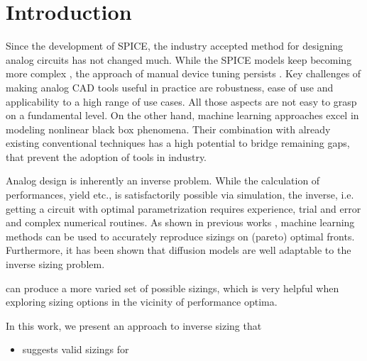 \documentclass[conference]{IEEEtran}
\begin{document}
\section{Introduction}
	Since the development of SPICE, the industry accepted method for designing analog circuits has not changed much. While the SPICE models keep becoming more complex \cite{gatermann22mosfet}, the approach of manual device tuning persists \cite{gielen23workshop}. Key challenges of making analog CAD tools useful in practice are robustness, ease of use and applicability to a high range of use cases. All those aspects are not easy to grasp on a fundamental level. On the other hand, machine learning approaches excel in modeling nonlinear black box phenomena. Their combination with already existing conventional techniques has a high potential to bridge remaining gaps, that prevent the adoption of tools in industry.
	
	Analog design is inherently an inverse problem. While the calculation of performances, yield etc., is satisfactorily possible via simulation, the inverse, i.e. getting a circuit with optimal parametrization requires experience, trial and error and complex numerical routines. As shown in previous works \cite{ leibl24inverse, lourenco19pareto}, machine learning methods can be used to accurately reproduce sizings on (pareto) optimal fronts. Furthermore, it has been shown \cite{eid24diffusion} that diffusion models are well adaptable to the inverse sizing problem.
	
	
	
	
	can produce a more varied set of possible sizings, which is very helpful when exploring sizing options in the vicinity of performance optima. 
	
	In this work, we present an approach to inverse sizing that
	\begin{itemize}
	\item suggests valid sizings for 
	\end{itemize}
	
\end{document}
